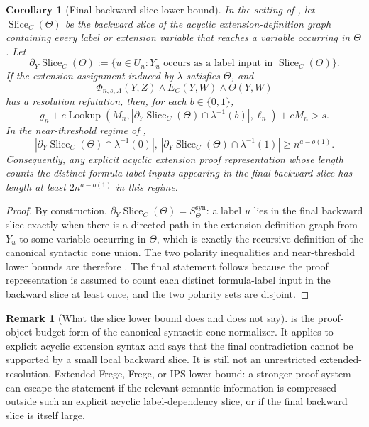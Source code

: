 \documentclass[11pt]{article}
\newtheorem{corollary}[theorem]{Corollary}
\theoremstyle{definition}
\newtheorem{remark}[theorem]{Remark}
\newcommand{\bits}{\{0,1\}}
\newcommand{\Lookup}{\operatorname{Lookup}}
\begin{document}
\begin{corollary}[Final backward-slice lower bound]\label{cor:final-backward-slice}
In the setting of , let \(\operatorname{Slice}_C(\Theta)\) be the backward slice of the acyclic extension-definition graph containing every label or extension variable that reaches a variable occurring in \(\Theta\).  Let
\[
  \partial_Y\operatorname{Slice}_C(\Theta):=\{u\in U_n:Y_u\text{ occurs as a label input in }\operatorname{Slice}_C(\Theta)\}.
\]
If the extension assignment induced by \(\lambda\) satisfies \(\Theta\), and
\[
  \Phi_{n,s,A}(Y,Z)\wedge E_C(Y,W)\wedge\Theta(Y,W)
\]
has a resolution refutation, then, for each \(b\in\bits\),
\[
  g_n+c\Lookup(M_n,|\partial_Y\operatorname{Slice}_C(\Theta)\cap\lambda^{-1}(b)|,\ell_n)+cM_n>s.
\]
In the near-threshold regime of ,
\[
  |\partial_Y\operatorname{Slice}_C(\Theta)\cap\lambda^{-1}(0)|,\,
  |\partial_Y\operatorname{Slice}_C(\Theta)\cap\lambda^{-1}(1)|
  \ge n^{a-o(1)}.
\]
Consequently, any explicit acyclic extension proof representation whose length counts the distinct formula-label inputs appearing in the final backward slice has length at least \(2n^{a-o(1)}\) in this regime.
\end{corollary}

\begin{proof}
By construction, \(\partial_Y\operatorname{Slice}_C(\Theta)=S^{\mathrm{syn}}_\Theta\): a label \(u\) lies in the final backward slice exactly when there is a directed path in the extension-definition graph from \(Y_u\) to some variable occurring in \(\Theta\), which is exactly the recursive definition of the canonical syntactic cone union.  The two polarity inequalities and near-threshold lower bounds are therefore .  The final statement follows because the proof representation is assumed to count each distinct formula-label input in the backward slice at least once, and the two polarity sets are disjoint.
\end{proof}

\begin{remark}[What the slice lower bound does and does not say]\label{rem:final-backward-slice-scope}
 is the proof-object budget form of the canonical syntactic-cone normalizer.  It applies to explicit acyclic extension syntax and says that the final contradiction cannot be supported by a small local backward slice.  It is still not an unrestricted extended-resolution, Extended Frege, Frege, or IPS lower bound: a stronger proof system can escape the statement if the relevant semantic information is compressed outside such an explicit acyclic label-dependency slice, or if the final backward slice is itself large.
\end{remark}
\end{document}
